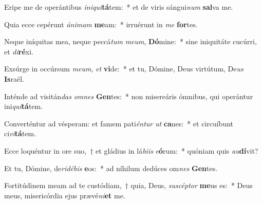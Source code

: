 \item Eripe me de operántibus \textit{in}\textit{i}\textit{qui}\textbf{tá}tem:~* et de viris sángui\textit{num} \textbf{sal}va me.
\item Quia ecce cepérunt \textit{á}\textit{ni}\textit{mam} \textbf{me}am:~* irruérunt in \textit{me} \textbf{for}tes.
\item Neque iníquitas mea, neque peccá\textit{tum} \textit{me}\textit{um}, \textbf{Dó}mine:~* sine iniquitáte cucúrri, et \textit{di}\textbf{ré}xi.
\item Exsúrge in occúrsum \textit{me}\textit{um}, \textit{et} \textbf{vi}de:~* et tu, Dómine, Deus virtútum, De\textit{us} \textbf{Is}raël.
\item Inténde ad visitán\textit{das} \textit{om}\textit{nes} \textbf{Gen}tes:~* non misereáris ómnibus, qui operántur ini\textit{qui}\textbf{tá}tem.
\item Converténtur ad vésperam: et famem pati\textit{én}\textit{tur} \textit{ut} \textbf{ca}nes:~* et circuíbunt ci\textit{vi}\textbf{tá}tem.
\item Ecce loquéntur in ore suo,~† et gládius in lá\textit{bi}\textit{is} \textit{e}\textbf{ó}rum:~* quóniam quis \textit{au}\textbf{dí}vit?
\item Et tu, Dómine, de\textit{ri}\textit{dé}\textit{bis} \textbf{e}os:~* ad níhilum dedúces om\textit{nes} \textbf{Gen}tes.
\item Fortitúdinem meam ad te custódiam,~† quia, Deus, \textit{su}\textit{scép}\textit{tor} \textbf{me}us es:~* Deus meus, misericórdia ejus prævé\textit{ni}\textbf{et} me.
